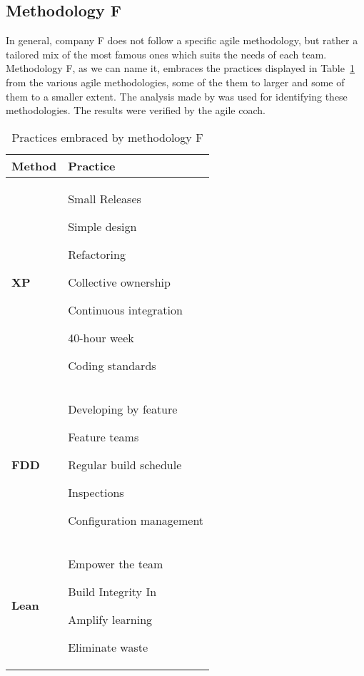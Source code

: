 \subsection{Methodology F}
In general, company F does not follow a specific agile methodology, but rather a tailored mix of the most famous ones which suits the needs of each team. Methodology F, as we can name it, embraces the practices displayed in Table~\ref{table:methodologyF_practices} from the various agile methodologies, some of the them to larger and some of them to a smaller extent. The analysis made by \citet{koch2005agile} was used for identifying these methodologies. The results were verified by the agile coach.

\begin{table} [H]
\caption{Practices embraced by methodology F}
\begin{tabular}{| p{2cm} | p{13cm}|}
    \hline
     \textbf{Method} & \textbf{Practice} \\ \hline
     \textbf{XP}  & \begin{inparaenum} [a\upshape)]
     				\item Small Releases \item Simple design \item Refactoring \item Collective ownership \item Continuous integration \item 40-hour week \item Coding standards
					\end{inparaenum}      \\ \hline
     \textbf{FDD}  & \begin{inparaenum} [a\upshape)]  \item Developing by feature \item Feature teams \item Regular build schedule \item Inspections \item Configuration management
     				  \end{inparaenum}\\ \hline
     \textbf{Lean} & \begin{inparaenum} [a\upshape)] \item Empower the team \item Build Integrity In \item Amplify learning \item Eliminate waste
     				 \end{inparaenum} \\ \hline
\end{tabular}
\label{table:methodologyF_practices}
\end{table}

